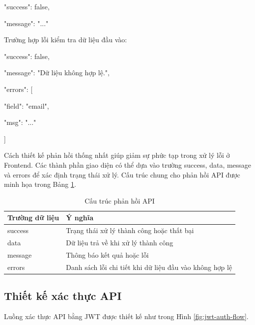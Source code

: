 \documentclass[12pt, a4paper]{report}
\begin{document}
{

  "success": false,

  "message": "..."

}

Trường hợp lỗi kiểm tra dữ liệu đầu vào:

{

  "success": false,

  "message": "Dữ liệu không hợp lệ.",

  "errors": [

    {

      "field": "email",

      "msg": "..."

    }

  ]

}

Cách thiết kế phản hồi thống nhất giúp giảm sự phức tạp trong xử lý lỗi ở Frontend. Các thành phần giao diện có thể dựa vào trường success, data, message và errors để xác định trạng thái xử lý. Cấu trúc chung cho phản hồi API được minh họa trong Bảng \ref{tab:cau_truc_phan_hoi}.

\begin{table}[htbp]
\centering
\caption{Cấu trúc phản hồi API}
\label{tab:cau_truc_phan_hoi}
\begin{tabular}{|>{\raggedright\arraybackslash}p{5cm}|p{10cm}|}
\hline
\textbf{Trường dữ liệu} & \textbf{Ý nghĩa} \\
\hline
success & Trạng thái xử lý thành công hoặc thất bại \\
\hline
data & Dữ liệu trả về khi xử lý thành công \\
\hline
message & Thông báo kết quả hoặc lỗi \\
\hline
errors & Danh sách lỗi chi tiết khi dữ liệu đầu vào không hợp lệ \\
\hline
\end{tabular}
\end{table}
\subsection{Thiết kế xác thực API}

Luồng xác thực API bằng JWT được thiết kế như trong Hình \ref{fig:jwt-auth-flow}.
\end{document}
